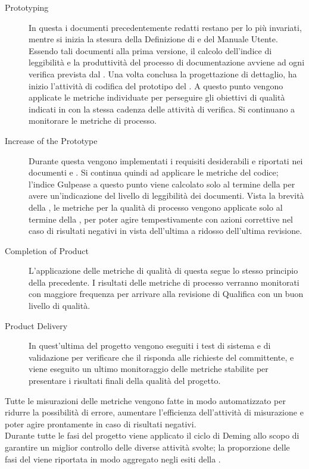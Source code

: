 \begin{description}
		\item[ Prototyping] In questa  i documenti precedentemente redatti restano per lo più invariati, mentre si inizia la stesura della Definizione di  e del Manuale Utente. Essendo tali documenti alla prima versione, il calcolo dell'indice di leggibilità e la produttività del processo di documentazione avviene ad ogni verifica prevista dal . Una volta conclusa la progettazione di dettaglio, ha inizio l'attività di codifica del prototipo del . A questo punto vengono applicate le metriche individuate per perseguire gli obiettivi di qualità indicati in  con la stessa cadenza delle attività di verifica. Si continuano a monitorare le metriche di processo.
		\item[ Increase of the Prototype] Durante questa  vengono implementati i requisiti desiderabili e riportati nei documenti  e . Si continua quindi ad applicare le metriche del codice; l'indice  Gulpease a questo punto viene calcolato solo al termine della  per avere un'indicazione del livello di leggibilità dei documenti. Vista la brevità della , le metriche per la qualità di processo vengono applicate solo al termine della , per poter agire tempestivamente con azioni correttive nel caso di risultati negativi in vista dell'ultima  a ridosso dell'ultima revisione.
		\item[ Completion of Product] L'applicazione delle metriche di qualità di questa  segue lo stesso principio della precedente. I risultati delle metriche di processo verranno monitorati con maggiore frequenza per arrivare alla revisione di Qualifica con un buon livello di qualità.
		\item[ Product Delivery] In quest'ultima  del progetto vengono eseguiti i test di sistema e di validazione per verificare che il  risponda alle richieste del committente, e viene eseguito un ultimo monitoraggio delle metriche stabilite per presentare i risultati finali della qualità del progetto.
		\end{description}
		Tutte le misurazioni delle metriche vengono fatte in modo automatizzato per ridurre la possibilità di errore, aumentare l'efficienza dell'attività di misurazione e poter agire prontamente in caso di risultati negativi.\\
		Durante tutte le fasi del progetto viene applicato il ciclo di Deming allo scopo di garantire un miglior controllo delle diverse attività svolte; la proporzione delle fasi del  viene riportata in modo aggregato negli esiti della .


